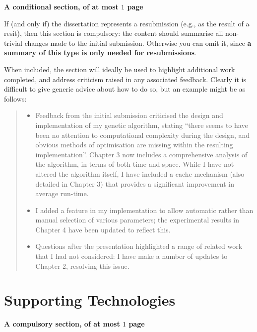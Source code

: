 \documentclass[ %
                    author={Daniel Page},
                supervisor={Dr. Andrew Calway},
                    degree={MSc},
                     title={Some Structural Guidelines for Data Science MSc Theses, Including Those With Long Titles that Run Across Multiple Lines on the Front Page},
                  subtitle={And those including an optional subtitle too, for good measure},
                      type={},
                      year={2021}]{dissertation}
\begin{document}
{\bf A conditional section, of at most $1$ page} 
\vspace{1cm} 

If (and only if) the dissertation represents a resubmission (e.g., as the result of
a resit), then this section is compulsory: the content should summarise all
non-trivial changes made to the initial submission.  Otherwise you can
omit it, since {\bf a summary of this type is only needed for resubmissions}.

When included, the section will ideally be used to highlight additional
work completed, and address criticism raised in any associated feedback.
Clearly it is difficult to give generic advice about how to do so, but
an example might be as follows:

\begin{quote}
\noindent
\begin{itemize}
\item Feedback from the initial submission criticised the design and 
      implementation of my genetic algorithm, stating ``there seems 
      to have been no attention to computational complexity during the
      design, and obvious methods of optimisation are missing within
      the resulting implementation''.  Chapter 3 now includes a
      comprehensive analysis of the algorithm, in terms of both time
      and space.  While I have not altered the algorithm itself, I
      have included a cache mechanism (also detailed in Chapter 3)
      that provides a significant improvement in average run-time.
\item I added a feature in my implementation to allow automatic rather
      than manual selection of various parameters; the experimental
      results in Chapter 4 have been updated to reflect this.
\item Questions after the presentation highlighted a range of related
      work that I had not considered: I have make a number of updates 
      to Chapter 2, resolving this issue.
\end{itemize}
\end{quote}


\chapter*{Supporting Technologies}

{\bf A compulsory section, of at most $1$ page}
\vspace{1cm} 
\end{document}
